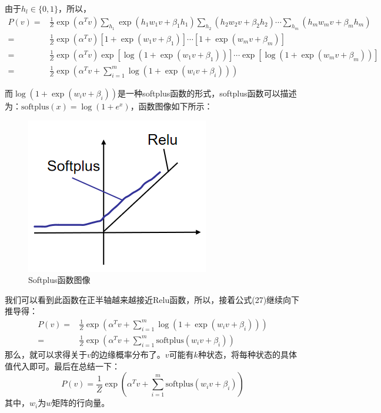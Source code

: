 \documentclass[a4paper]{article}
\begin{document}
由于$h_l \in\{0,1\}$，所以，
\begin{equation}
\begin{split}
    P(v) = &\frac{1}{Z} \exp(\alpha^T v) \sum_{h_1}\exp (h_1w_1v + \beta_1 h_1) \sum_{h_2}(h_2w_2v + \beta_2 h_2) \cdots \sum_{h_m}(h_mw_mv + \beta_m h_m) \\
    = &\frac{1}{Z} \exp(\alpha^T v) \left[ 1+\exp(w_1v+\beta_1) \right]\cdots \left[ 1+\exp(w_mv+\beta_m) \right] \\
    = & \frac{1}{Z} \exp(\alpha^T v) \exp \left[\log ( 1+\exp(w_1v+\beta_1)) \right]\cdots \exp \left[\log ( 1+\exp(w_mv+\beta_m)) \right] \\
    = & \frac{1}{Z} \exp\left(\alpha^T v + \sum_{i=1}^m \log ( 1+\exp(w_iv+\beta_i)) \right)
\end{split}
\end{equation}

而$\log ( 1+\exp(w_iv+\beta_i))$是一种softplus函数的形式，softplus函数可以描述为：$\mathrm{softplus}(x) = \log(1+e^x)$，函数图像如下所示：
\begin{figure}[H]
    \centering
    \includegraphics[width=.45\textwidth]{微信图片_20200301132709.png}
    \caption{Softplus函数图像}
    \label{fig:my_label_1}
\end{figure}
我们可以看到此函数在正半轴越来越接近Relu函数，所以，接着公式(27)继续向下推导得：
\begin{equation}
\begin{split}
    P(v) = & \frac{1}{Z} \exp\left(\alpha^T v + \sum_{i=1}^m \log ( 1+\exp(w_iv+\beta_i)) \right) \\
    = &\frac{1}{Z} \exp\left(\alpha^T v + \sum_{i=1}^m \mathrm{softplus} ( w_iv+\beta_i) \right)
\end{split}
\end{equation}
那么，就可以求得关于$v$的边缘概率分布了。$v$可能有$k$种状态，将每种状态的具体值代入即可。最后在总结一下：
\begin{equation}
    P(v)
    = \frac{1}{Z} \exp\left(\alpha^T v + \sum_{i=1}^m \mathrm{softplus} ( w_iv+\beta_i) \right)
\end{equation}
其中，$w_i$为$w$矩阵的行向量。
\end{document}
